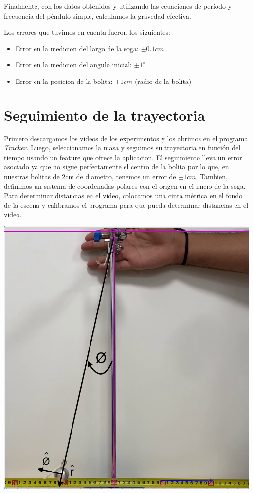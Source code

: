 \documentclass[12pt,a4]{article}
\begin{document}
Finalmente, con los datos obtenidos y utilizando las ecuaciones de período y frecuencia del péndulo simple, calculamos la gravedad efectiva.


Los errores que tuvimos en cuenta fueron los siguientes:

\begin{itemize}
    \item Error en la medicion del largo de la soga: $\pm 0.1 cm$
    \item Error en la medicion del angulo inicial: $\pm 1^\circ$
    \item Error en la posicion de la bolita: $\pm 1 cm$ (radio de la bolita)
\end{itemize}

\section{Seguimiento de la trayectoria}

\begin{minipage}{0.5\textwidth}
    Primero descargamos los videos de los experimentos y los abrimos en el programa \textit{Tracker}. Luego, seleccionamos la masa y seguimos su trayectoria en función del tiempo usando un feature que ofrece la aplicacion. El seguimiento lleva un error asociado ya que no sigue perfectamente el centro de la bolita por lo que, en nuestras bolitas de 2cm de diametro, tenemos un error de $\pm 1cm$. Tambien, definimos un sistema de coordenadas polares con el origen en el inicio de la soga. Para determinar distancias en el video, colocamos una cinta métrica en el fondo de la escena y calibramos el programa para que pueda determinar distancias en el video. 
\end{minipage}
\begin{minipage}{0.5\textwidth}
    \centering
    \includegraphics[width=0.8\linewidth]{tracker.png}
\end{minipage}
\end{document}
